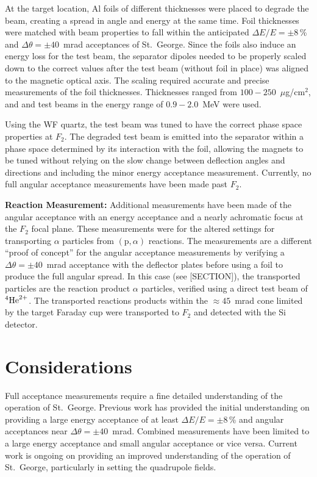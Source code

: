 At the target location, Al foils of different thicknesses were placed to
degrade the beam, creating a spread in angle and energy at the same time. Foil
thicknesses were matched with beam properties to fall within the anticipated
$\Delta E/E = \pm 8$\,\% and $\Delta\theta = \pm 40$~mrad acceptances of St.\
George. Since the foils also induce an energy loss for the test beam, the
separator dipoles needed to be properly scaled down to the correct values after
the test beam (without foil in place) was aligned to the magnetic optical axis.
The scaling required accurate and precise measurements of the foil thicknesses.
Thicknesses ranged from $100-250$~$\mu$g/cm$^2$, and \nuc{1}{H} and \nuc{4}{He}
test beams in the energy range of $0.9-2.0$~MeV were used.

Using the WF quartz, the test beam was tuned to have the correct phase space
properties at $F_2$. The degraded test beam is emitted into the separator
within a phase space determined by its interaction with the foil, allowing the
magnets to be tuned without relying on the slow change between deflection
angles and directions and including the minor energy acceptance measurement.
Currently, no full angular acceptance measurements have been made past $F_2$.


\textbf{Reaction Measurement:}
Additional measurements have been made of the angular acceptance with an
energy acceptance and a nearly achromatic focus at the $F_2$ focal plane. These
measurements were for the altered settings for transporting $\alpha$ particles
from $(\textrm{p},\alpha)$ reactions. The measurements are a different ``proof
of concept'' for the angular acceptance measurements by verifying a
$\Delta\theta = \pm 40$~mrad acceptance with the deflector plates before using
a foil to produce the full angular spread. In this case (see [SECTION]), the
transported particles are the reaction product $\alpha$ particles, verified
using a direct test beam of ${}^{4}\textrm{He}^{2+}$. The transported reactions
products within the $\approx 45$~mrad cone limited by the target Faraday cup were
transported to $F_2$ and detected with the Si detector.


\section{Considerations}

Full acceptance measurements require a fine detailed understanding of the
operation of St.\ George. Previous work has provided the initial understanding
on providing a large energy acceptance of at least $\Delta E/E = \pm 8$\,\% and
angular acceptances near $\Delta\theta = \pm 40$~mrad. Combined measurements
have been limited to a large energy acceptance and small angular acceptance or
vice versa. Current work is ongoing on providing an improved understanding of
the operation of St.\ George, particularly in setting the quadrupole fields.

